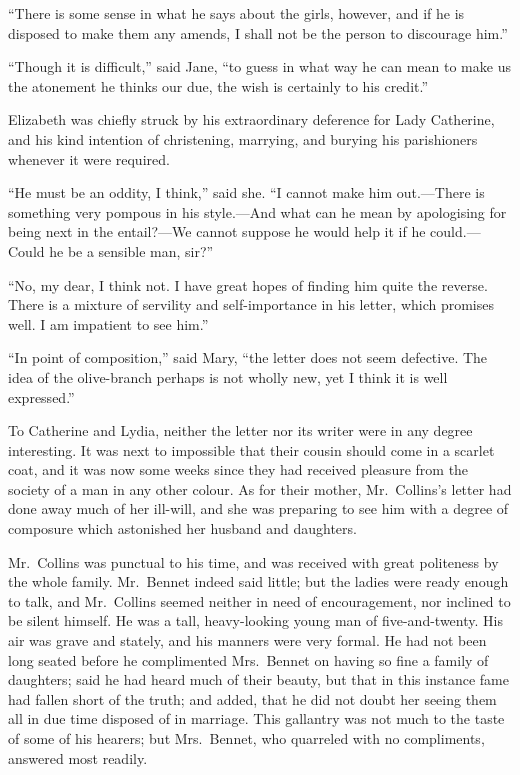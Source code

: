 \documentclass[12pt,english,oneside]{book}
\begin{document}
{}``There is some sense in what he says about the girls, however,
and if he is disposed to make them any amends, I shall not be the
person to discourage him.''

{}``Though it is difficult,'' said Jane, {}``to guess in what way
he can mean to make us the atonement he thinks our due, the wish is
certainly to his credit.''

Elizabeth was chiefly struck by his extraordinary deference for Lady
Catherine, and his kind intention of christening, marrying, and burying
his parishioners whenever it were required.

{}``He must be an oddity, I think,'' said she. {}``I cannot make
him out.\mbox{---}There is something very pompous in his style.\mbox{---}And
what can he mean by apologising for being next in the entail?\mbox{---}We
cannot suppose he would help it if he could.\mbox{---}Could he be
a sensible man, sir?''\ 

{}``No, my dear, I think not. I have great hopes of finding him quite
the reverse. There is a mixture of servility and self-importance in
his letter, which promises well. I am impatient to see him.''

{}``In point of composition,'' said Mary, {}``the letter does not
seem defective. The idea of the olive-branch perhaps is not wholly
new, yet I think it is well expressed.''

To Catherine and Lydia, neither the letter nor its writer were in
any degree interesting. It was next to impossible that their cousin
should come in a scarlet coat, and it was now some weeks since they
had received pleasure from the society of a man in any other colour.
As for their mother, Mr.\ Collins's letter had done away much of
her ill-will, and she was preparing to see him with a degree of composure
which astonished her husband and daughters.

Mr.\ Collins was punctual to his time, and was received with great
politeness by the whole family. Mr.\ Bennet indeed said little; but
the ladies were ready enough to talk, and Mr.\ Collins seemed neither
in need of encouragement, nor inclined to be silent himself. He was
a tall, heavy-looking young man of five-and-twenty. His air was grave
and stately, and his manners were very formal. He had not been long
seated before he complimented Mrs.\ Bennet on having so fine a family
of daughters; said he had heard much of their beauty, but that in
this instance fame had fallen short of the truth; and added, that
he did not doubt her seeing them all in due time disposed of in marriage.
This gallantry was not much to the taste of some of his hearers; but
Mrs.\ Bennet, who quarreled with no compliments, answered most readily.
\end{document}
